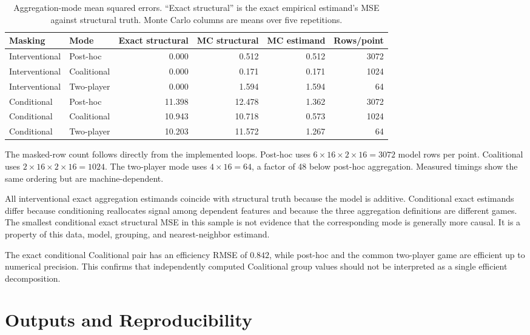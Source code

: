 \documentclass[11pt]{article}
\begin{document}
\begin{table}[H]
\centering
\small
\begin{tabular}{@{}llrrrr@{}}
\toprule
Masking & Mode & Exact structural & MC structural & MC estimand & Rows/point \\
\midrule
Interventional & Post-hoc & 0.000 & 0.512 & 0.512 & 3072 \\
Interventional & Coalitional & 0.000 & 0.171 & 0.171 & 1024 \\
Interventional & Two-player & 0.000 & 1.594 & 1.594 & 64 \\
Conditional & Post-hoc & 11.398 & 12.478 & 1.362 & 3072 \\
Conditional & Coalitional & 10.943 & 10.718 & 0.573 & 1024 \\
Conditional & Two-player & 10.203 & 11.572 & 1.267 & 64 \\
\bottomrule
\end{tabular}
\caption{Aggregation-mode mean squared errors.  ``Exact structural'' is the
exact empirical estimand's MSE against structural truth.  Monte Carlo columns
are means over five repetitions.}
\label{tab:aggregation-results}
\end{table}

The masked-row count follows directly from the implemented loops.  Post-hoc
uses \(6\times16\times2\times16=3072\) model rows per point.  Coalitional uses
\(2\times16\times2\times16=1024\).  The two-player mode uses
\(4\times16=64\), a factor of 48 below post-hoc aggregation.  Measured timings
show the same ordering but are machine-dependent.

All interventional exact aggregation estimands coincide with structural truth
because the model is additive.  Conditional exact estimands differ because
conditioning reallocates signal among dependent features and because the three
aggregation definitions are different games.  The smallest conditional exact
structural MSE in this sample is not evidence that the corresponding mode is
generally more causal.  It is a property of this data, model, grouping, and
nearest-neighbor estimand.

The exact conditional Coalitional pair has an efficiency RMSE of \(0.842\),
while post-hoc and the common two-player game are efficient up to numerical
precision.  This confirms that independently computed Coalitional group values
should not be interpreted as a single efficient decomposition.

\section{Outputs and Reproducibility}
\end{document}
